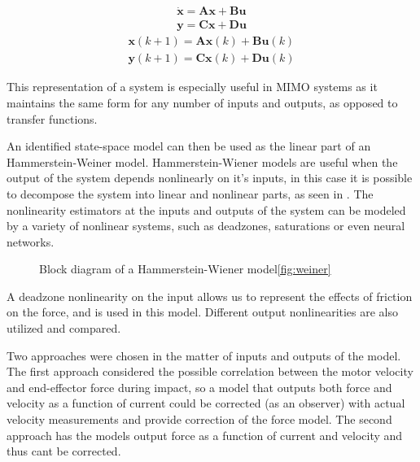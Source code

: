 \begin{align}\label{eq:ssc}
\dot{\mathbf{x}} = \mathbf{A}\mathbf{x} + \mathbf{B}\mathbf{u} \\
\mathbf{y} = \mathbf{C}\mathbf{x} + \mathbf{D}\mathbf{u}
\end{align}
\vspace{-0.5cm}
\begin{align}\label{eq:ssd}
\mathbf{x}(k+1) = \mathbf{A}\mathbf{x}(k) + \mathbf{B}\mathbf{u}(k)\\
\mathbf{y}(k+1) = \mathbf{C}\mathbf{x}(k) + \mathbf{D}\mathbf{u}(k)
\end{align}

This representation of a system is especially useful in MIMO systems as it maintains the same form for any number of inputs and outputs, as opposed to transfer functions.

An identified state-space model can then be used as the linear part of an Hammerstein-Weiner model.
Hammerstein-Wiener models are useful when the output of the system depends nonlinearly on it's inputs, in this case it is possible to decompose the system into linear and nonlinear parts, as seen in . 
The nonlinearity estimators at the inputs and outputs of the system can be modeled by a variety of nonlinear systems, such as deadzones, saturations or even neural networks.

\begin{figure} 
\caption{Block diagram of a Hammerstein-Wiener model\ref{fig:weiner}}
\label{weiner}
\end{figure}

A deadzone nonlinearity on the input allows us to represent the effects of friction on the force, and is used in this model.
Different output nonlinearities are also utilized and compared.

Two approaches were chosen in the matter of inputs and outputs of the model.
The first approach considered the possible correlation between the motor velocity and end-effector force during impact, so a model that outputs both force and velocity as a function of current could be corrected (as an observer) with actual velocity measurements and provide correction of the force model.
The second approach has the models output force as a function of current and velocity and thus cant be corrected.

